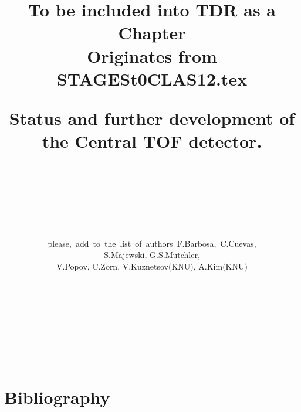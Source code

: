 %
%

\pagestyle{headings}

\title
{
\vspace{-1.4cm}
\begin{flushright}
\normalsize{To be included into TDR as a Chapter\\
Originates from STAGESt0CLAS12.tex}
\bigskip
\bigskip
\bigskip
\bigskip
\bigskip
\bigskip
\bigskip
\bigskip
\nopagebreak
\end{flushright}
Status and further development of the   
 Central TOF detector.}
\author
{
{}\\
{}\\
{}\\ 
{}\\
{}\\
{}\\
\mbox
 {please, add to the list of authors F.Barbosa,  C.Cuevas,} \\
 {S.Majewski,  G.S.Mutchler,}   \\
 {V.Popov, C.Zorn, V.Kuznetsov(KNU), A.Kim(KNU) }   \\
{}\\
{}\\
\mbox 
{}\\
{}\\
{}\\
{}\\
{}\\
}
%
\maketitle   

\begin{abstract}
\end{abstract}

\newpage
\tableofcontents
\newpage
\listoftables
\newpage
\listoffigures
\newpage


\newpage
\section{Bibliography}

\newpage

